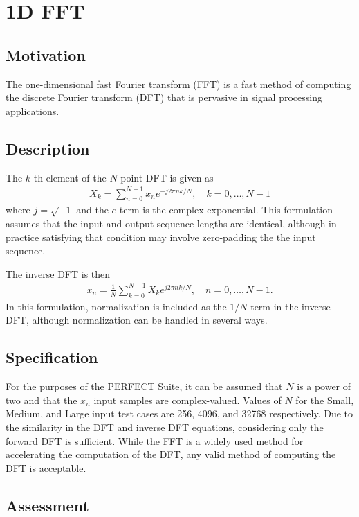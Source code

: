 \documentclass{report}
\begin{document}
\section{1D FFT}

\subsection{Motivation}

The one-dimensional fast Fourier transform (FFT) is a fast method of computing the
discrete Fourier transform (DFT) that is pervasive in signal processing applications.


\subsection{Description}

The $k$-th element of the $N$-point DFT is given as
\begin{align}
    X_k = \sum_{n=0}^{N-1} x_n e^{-j2\pi nk/N}, \quad k = 0, \ldots, N-1
\end{align}
where $j = \sqrt{-1}$ and the $e$ term is the complex exponential.
This formulation assumes that the input and output sequence lengths
are identical, although in practice satisfying that condition may involve
zero-padding the the input sequence.

The inverse DFT is then
\begin{align}
    x_n = \frac{1}{N} \sum_{k=0}^{N-1} X_k e^{j2\pi nk/N}, \quad n = 0, \ldots, N-1.
\end{align}
In this formulation, normalization is included as the $1/N$ term in the inverse DFT,
although normalization can be handled in several ways.

\subsection{Specification}

For the purposes of the PERFECT Suite, it can be assumed that
$N$ is a power of two and that the $x_n$ input samples are complex-valued.
Values of $N$ for the Small, Medium, and Large input test cases are
256, 4096, and 32768 respectively.
Due to the similarity in the DFT and inverse DFT equations,
considering only the forward DFT is sufficient.
While the FFT is a widely used method for accelerating the computation of the DFT,
any valid method of computing the DFT is acceptable.

\subsection{Assessment}
\end{document}
